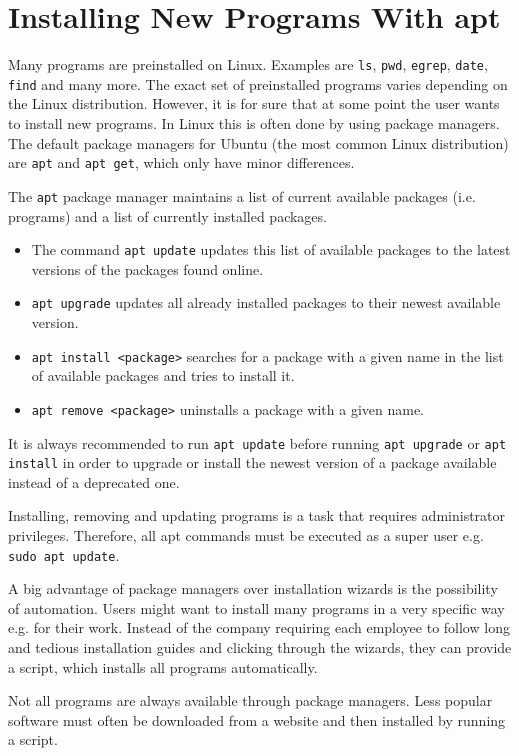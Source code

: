 \section{Installing New Programs With apt}

Many programs are preinstalled on Linux. Examples are \lstinline{ls}, \lstinline{pwd}, \lstinline{egrep}, \lstinline{date}, \lstinline{find} and many more. The exact set of preinstalled programs varies depending on the Linux distribution. However, it is for sure that at some point the user wants to install new programs. In Linux this is often done by using package managers. The default package managers for Ubuntu (the most common Linux distribution) are \lstinline{apt} and \lstinline{apt get}, which only have minor differences.

The \lstinline{apt} package manager maintains a list of current available packages (i.e. programs) and a list of currently installed packages.

\begin{itemize}
    \item The command \lstinline{apt update} updates this list of available packages to the latest versions of the packages found online.
    \item \lstinline{apt upgrade} updates all already installed packages to their newest available version.
    \item \lstinline{apt install <package>} searches for a package with a given name in the list of available packages and tries to install it.
    \item \lstinline{apt remove <package>} uninstalls a package with a given name.
\end{itemize}

It is always recommended to run \lstinline{apt update} before running \lstinline{apt upgrade} or \lstinline{apt install} in order to upgrade or install the newest version of a package available instead of a deprecated one.

Installing, removing and updating programs is a task that requires administrator privileges. Therefore, all apt commands must be executed as a super user e.g. \lstinline{sudo apt update}. 

A big advantage of package managers over installation wizards is the possibility of automation. Users might want to install many programs in a very specific way e.g. for their work. Instead of the company requiring each employee to follow long and tedious installation guides and clicking through the wizards, they can provide a script, which installs all programs automatically.

Not all programs are always available through package managers. Less popular software must often be downloaded from a website and then installed by running a script. 


  